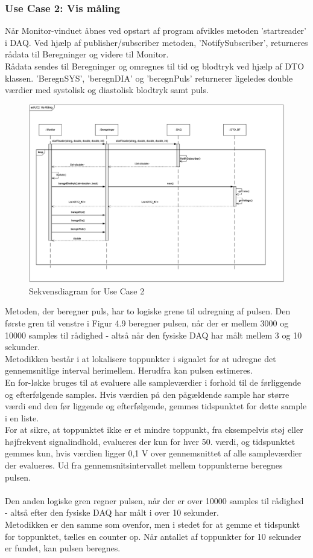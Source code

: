 \subsubsection{Use Case 2: Vis måling}
Når Monitor-vinduet åbnes ved opstart af program afvikles metoden 'startreader' i DAQ. Ved hjælp af publisher/subscriber metoden, 'NotifySubscriber', returneres rådata til Beregninger og videre til Monitor.\\
Rådata sendes til Beregninger og omregnes til tid og blodtryk ved hjælp af DTO klassen.
'BeregnSYS', 'beregnDIA' og 'beregnPuls' returnerer ligeledes double værdier med systolisk og diastolisk blodtryk samt puls. 
\begin{figure}[H]
	\centering
	\includegraphics[width=1\textwidth]{Figurer/UC2_SD_SW}
	\caption{Sekvensdiagram for Use Case 2}
\end{figure}

Metoden, der beregner puls, har to logiske grene til udregning af pulsen. Den første gren til venstre i Figur 4.9 beregner pulsen, når der er mellem 3000 og 10000 samples til rådighed - altså når den fysiske DAQ har målt mellem 3 og 10 sekunder.\\
Metodikken består i at lokalisere toppunkter i signalet for at udregne det gennemsnitlige interval herimellem. Herudfra kan pulsen estimeres. \\
En for-løkke bruges til at evaluere alle sampleværdier i forhold til de førliggende og efterfølgende samples. Hvis værdien på den pågældende sample har større værdi end den før liggende og efterfølgende, gemmes tidspunktet for dette sample i en liste.\\ 
For at sikre, at toppunktet ikke er et mindre toppunkt, fra eksempelvis støj eller højfrekvent signalindhold, evalueres der kun for hver 50. værdi, og tidspunktet gemmes kun, hvis værdien ligger 0,1 V over gennemsnittet af alle sampleværdier der evalueres. Ud fra gennemsnitsintervallet mellem toppunkterne beregnes pulsen.
\\
\\
Den anden logiske gren regner pulsen, når der er over 10000 samples til rådighed - altså efter den fysiske DAQ har målt i over 10 sekunder.\\ 
Metodikken er den samme som ovenfor, men i stedet for at gemme et tidspunkt for toppunktet, tælles en counter op. Når antallet af toppunkter for 10 sekunder er fundet, kan pulsen beregnes.

